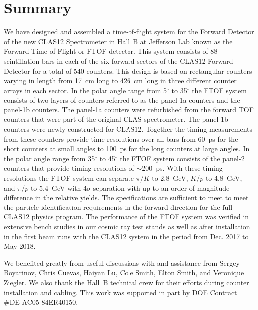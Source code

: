 \documentclass{elsart}
\begin{document}

\section{Summary}
\label{sec:summary}

We have designed and assembled a time-of-flight system for the Forward Detector of the new CLAS12
Spectrometer in Hall~B at Jefferson Lab known as the Forward Time-of-Flight or FTOF detector. This
system consists of 88 scintillation bars in each of the six forward sectors of the CLAS12 Forward Detector
for a total of 540 counters. This design is based on rectangular counters varying in length from 17~cm long
to 426~cm long in three different counter arrays in each sector. In the polar angle range from 5$^\circ$ to
35$^\circ$ the FTOF system consists of two layers of counters referred to as the panel-1a counters and the
panel-1b counters. The panel-1a counters were refurbished from the forward TOF counters that were part
of the original CLAS spectrometer. The panel-1b counters were newly constructed for CLAS12. Together the
timing measurements from these counters provide time resolutions over all bars from 60~ps for the short
counters at small angles to 100~ps for the long counters at large angles. In the polar angle range from
35$^\circ$ to 45$^\circ$ the FTOF system consists of the panel-2 counters that provide timing resolutions
of $\sim$200~ps. With these timing resolutions the FTOF system can separate $\pi/K$ to 2.8~GeV, $K/p$
to 4.8~GeV, and $\pi/p$ to 5.4~GeV with 4$\sigma$ separation with up to an order of magnitude difference
in the relative yields.  The specifications are sufficient to meet to meet the particle identification requirements
in the forward direction for the full CLAS12 physics program. The performance of the FTOF system was
verified in extensive bench studies in our cosmic ray test stands as well as after installation in the first beam
runs with the CLAS12 system in the period from Dec. 2017 to May 2018. 

\ack

We benefited greatly from useful discussions with and assistance from Sergey Boyarinov, Chris Cuevas,
Haiyan Lu, Cole Smith, Elton Smith, and Veronique Ziegler. We also thank the Hall~B technical crew for their
efforts during counter installation and cabling. This work was supported in part by DOE Contract
\#DE-AC05-84ER40150.

\newpage
\end{document}
